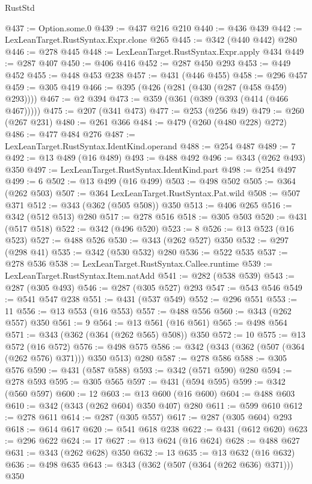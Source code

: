 \begin{lexlean}{RustStd}
\begin{coremodule}
{\begin{coremodule}
{{{{{{{@437 := Option.some.{0}
@439 := @437 @216 @210
@440 := @436 @439
@442 := LexLeanTarget.RustSyntax.Expr.clone @265
@445 := @342 (@440 @442) @280
@446 := @278 @445
@448 := LexLeanTarget.RustSyntax.Expr.apply @434
@449 := @287 @407
@450 := @406 @416
@452 := @287 @450 @293
@453 := @449 @452
@455 := @448 @453 @238
@457 := @431 (@446 @455)
@458 := @296 @457
@459 := @305 @419
@466 := @395 (@426 (@281 (@430 (@287 (@458 @459) @293))))
@467 := @2 @394
@473 := @359 (@361 (@389 (@393 (@414 (@466 @467)))))
@475 := @207 (@341 @473)
@477 := @253 (@256 @49)
@479 := @260 (@267 @231)
@480 := @261 @366
@484 := @479 (@260 (@480 @228) @272)
@486 := @477 @484 @276
@487 := LexLeanTarget.RustSyntax.IdentKind.operand
@488 := @254 @487
@489 := 7
@492 := @13 @489 (@16 @489)
@493 := @488 @492
@496 := @343 (@262 @493) @350
@497 := LexLeanTarget.RustSyntax.IdentKind.part
@498 := @254 @497
@499 := 6
@502 := @13 @499 (@16 @499)
@503 := @498 @502
@505 := @364 (@262 @503)
@507 := @364 LexLeanTarget.RustSyntax.Pat.wild
@508 := @507 @371
@512 := @343 (@362 (@505 @508)) @350
@513 := @406 @265
@516 := @342 (@512 @513) @280
@517 := @278 @516
@518 := @305 @503
@520 := @431 (@517 @518)
@522 := @342 (@496 @520)
@523 := 8
@526 := @13 @523 (@16 @523)
@527 := @488 @526
@530 := @343 (@262 @527) @350
@532 := @297 (@298 @41)
@535 := @342 (@530 @532) @280
@536 := @522 @535
@537 := @278 @536
@538 := LexLeanTarget.RustSyntax.Callee.runtime
@539 := LexLeanTarget.RustSyntax.Item.natAdd
@541 := @282 (@538 @539)
@543 := @287 (@305 @493)
@546 := @287 (@305 @527) @293
@547 := @543 @546
@549 := @541 @547 @238
@551 := @431 (@537 @549)
@552 := @296 @551
@553 := 11
@556 := @13 @553 (@16 @553)
@557 := @488 @556
@560 := @343 (@262 @557) @350
@561 := 9
@564 := @13 @561 (@16 @561)
@565 := @498 @564
@571 := @343 (@362 (@364 (@262 @565) @508)) @350
@572 := 10
@575 := @13 @572 (@16 @572)
@576 := @498 @575
@586 := @342 (@343 (@362 (@507 (@364 (@262 @576) @371))) @350 @513) @280
@587 := @278 @586
@588 := @305 @576
@590 := @431 (@587 @588)
@593 := @342 (@571 @590) @280
@594 := @278 @593
@595 := @305 @565
@597 := @431 (@594 @595)
@599 := @342 (@560 @597)
@600 := 12
@603 := @13 @600 (@16 @600)
@604 := @488 @603
@610 := @342 (@343 (@262 @604) @350 @407) @280
@611 := @599 @610
@612 := @278 @611
@614 := @287 (@305 @557)
@617 := @287 (@305 @604) @293
@618 := @614 @617
@620 := @541 @618 @238
@622 := @431 (@612 @620)
@623 := @296 @622
@624 := 17
@627 := @13 @624 (@16 @624)
@628 := @488 @627
@631 := @343 (@262 @628) @350
@632 := 13
@635 := @13 @632 (@16 @632)
@636 := @498 @635
@643 := @343 (@362 (@507 (@364 (@262 @636) @371))) @350
}}}}}}}
\end{coremodule}}
\end{coremodule}
\end{lexlean}
